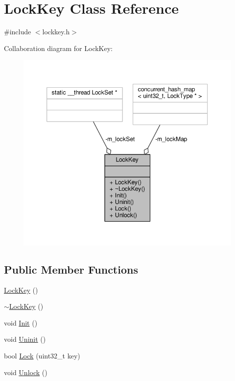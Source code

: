 \hypertarget{classLockKey}{\section{Lock\-Key Class Reference}
\label{classLockKey}
}


{\ttfamily \#include $<$lockkey.\-h$>$}



Collaboration diagram for Lock\-Key\-:
\nopagebreak
\begin{figure}[H]
\begin{center}
\leavevmode
\includegraphics[width=349pt]{classLockKey__coll__graph}
\end{center}
\end{figure}
\subsection*{Public Member Functions}
\begin{DoxyCompactItemize}
\item 
\hyperlink{classLockKey_aec8e18e5043d0fc71a850189aa097fc6}{Lock\-Key} ()
\item 
\hyperlink{classLockKey_a1df4a35c5d73aebeb969413a305a4c0e}{$\sim$\-Lock\-Key} ()
\item 
void \hyperlink{classLockKey_a06617ba173ee5e0097aeca576e79f1f4}{Init} ()
\item 
void \hyperlink{classLockKey_adf4f2e48d3a2456e4ef8cb9d1d13f713}{Uninit} ()
\item 
bool \hyperlink{classLockKey_ae524bd315c5de22c405e19875b27d6d3}{Lock} (uint32\-\_\-t key)
\item 
void \hyperlink{classLockKey_acb4b0e1caa6571dae666f3bcbb367df0}{Unlock} ()
\end{DoxyCompactItemize}
